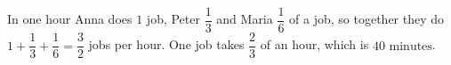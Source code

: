 In one hour Anna does $1$ job, Peter $\dfrac{1}{3}$ and Maria $\dfrac{1}{6}$ of a job, so together they do $1+\dfrac{1}{3}+\dfrac{1}{6}=\dfrac{3}{2}$ jobs per hour. One job takes $\dfrac{2}{3}$ of an hour, which is $\boxed{40\text{ minutes}}$.

